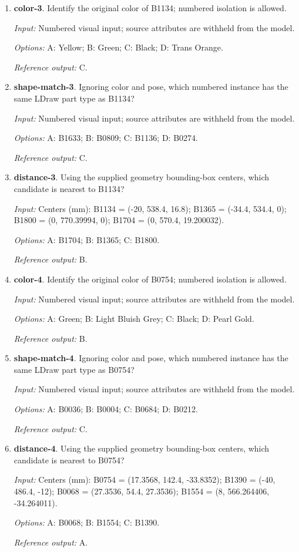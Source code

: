 \begin{enumerate}
\item \textbf{color-3}. Identify the original color of B1134; numbered isolation is allowed.\par {\small \textit{Input:} Numbered visual input; source attributes are withheld from the model. \par\textit{Options:} A: Yellow; B: Green; C: Black; D: Trans Orange. \par\textit{Reference output:} C.}
\item \textbf{shape-match-3}. Ignoring color and pose, which numbered instance has the same LDraw part type as B1134?\par {\small \textit{Input:} Numbered visual input; source attributes are withheld from the model. \par\textit{Options:} A: B1633; B: B0809; C: B1136; D: B0274. \par\textit{Reference output:} C.}
\item \textbf{distance-3}. Using the supplied geometry bounding-box centers, which candidate is nearest to B1134?\par {\small \textit{Input:} Centers (mm): B1134 = (-20, 538.4, 16.8); B1365 = (-34.4, 534.4, 0); B1800 = (0, 770.39994, 0); B1704 = (0, 570.4, 19.200032). \par\textit{Options:} A: B1704; B: B1365; C: B1800. \par\textit{Reference output:} B.}
\item \textbf{color-4}. Identify the original color of B0754; numbered isolation is allowed.\par {\small \textit{Input:} Numbered visual input; source attributes are withheld from the model. \par\textit{Options:} A: Green; B: Light Bluish Grey; C: Black; D: Pearl Gold. \par\textit{Reference output:} B.}
\item \textbf{shape-match-4}. Ignoring color and pose, which numbered instance has the same LDraw part type as B0754?\par {\small \textit{Input:} Numbered visual input; source attributes are withheld from the model. \par\textit{Options:} A: B0036; B: B0004; C: B0684; D: B0212. \par\textit{Reference output:} C.}
\item \textbf{distance-4}. Using the supplied geometry bounding-box centers, which candidate is nearest to B0754?\par {\small \textit{Input:} Centers (mm): B0754 = (17.3568, 142.4, -33.8352); B1390 = (-40, 486.4, -12); B0068 = (27.3536, 54.4, 27.3536); B1554 = (8, 566.264406, -34.264011). \par\textit{Options:} A: B0068; B: B1554; C: B1390. \par\textit{Reference output:} A.}

\end{enumerate}
